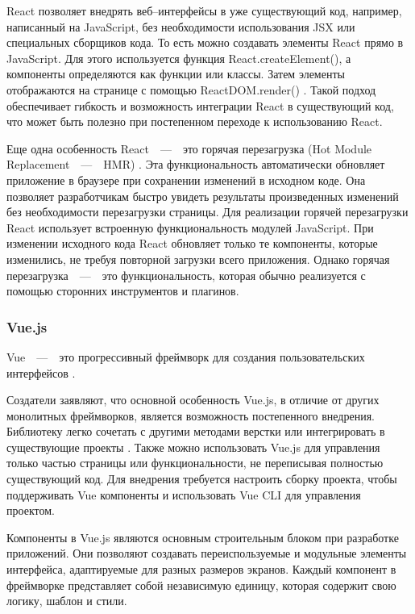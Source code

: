 React позволяет внедрять веб--интерфейсы в уже существующий код, например, написанный на JavaScript, без необходимости использования JSX или специальных сборщиков кода. 
То есть можно создавать элементы React прямо в JavaScript.
Для этого используется функция React.createElement(), а компоненты определяются как функции или классы. 
Затем элементы отображаются на странице с помощью ReactDOM.render() \cite{react-doc}.
Такой подход обеспечивает гибкость и возможность интеграции React в существующий код, что может быть полезно при постепенном переходе к использованию React.

Еще одна особенность React~~---~~это горячая перезагрузка (Hot Module Replacement~~---~~HMR) \cite{hmr}. 
Эта функциональность автоматически обновляет приложение в браузере при сохранении изменений в исходном коде. 
Она позволяет разработчикам быстро увидеть результаты произведенных изменений без необходимости перезагрузки страницы.
Для реализации горячей перезагрузки React использует встроенную функциональность модулей JavaScript. 
При изменении исходного кода React обновляет только те компоненты, которые изменились, не требуя повторной загрузки всего приложения.
Однако горячая перезагрузка~~---~~это функциональность, которая обычно реализуется с помощью сторонних инструментов и плагинов.


\subsubsection{Vue.js}

Vue~~---~~это прогрессивный фреймворк для создания пользовательских интерфейсов \cite{vue}. 

Создатели заявляют, что основной особенность Vue.js, в отличие от других монолитных фреймворков, является возможность постепенного внедрения. 
Библиотеку легко сочетать с другими методами верстки или интегрировать в существующие проекты \cite{vue}.
Также можно использовать Vue.js для управления только частью страницы или функциональности, не переписывая полностью существующий код.
Для внедрения требуется настроить сборку проекта, чтобы поддерживать Vue компоненты и использовать Vue CLI \cite{vue-cli} для управления проектом.

Компоненты в Vue.js являются основным строительным блоком при разработке приложений. 
Они позволяют создавать переиспользуемые и модульные элементы интерфейса, адаптируемые для разных размеров экранов.
Каждый компонент в фреймворке представляет собой независимую единицу, которая содержит свою логику, шаблон и стили.

